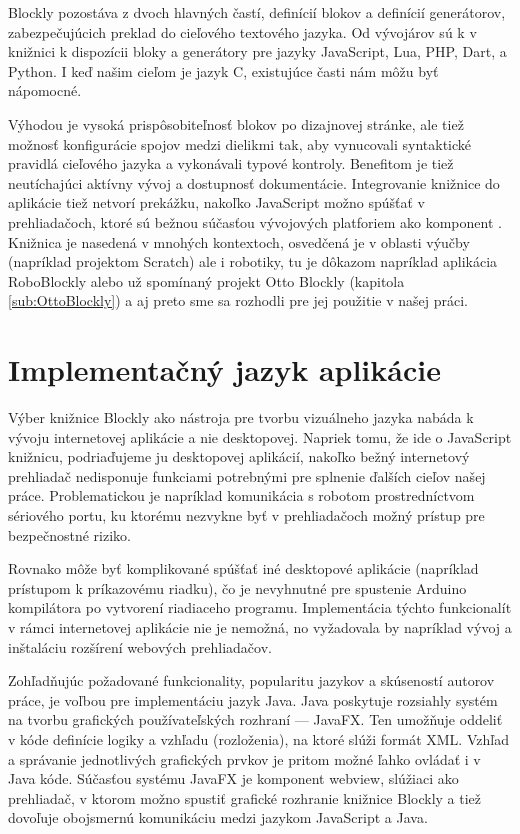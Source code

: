 Blockly pozostáva z dvoch hlavných častí, definícií blokov a definícií generátorov, zabezpečujúcich preklad do cieľového textového jazyka. Od vývojárov sú k v knižnici k dispozícii  bloky a generátory pre jazyky JavaScript, Lua, PHP, Dart, a Python. I keď našim cieľom je jazyk C, existujúce časti nám môžu byť nápomocné.

Výhodou je vysoká prispôsobiteľnosť blokov po dizajnovej stránke, ale tiež možnosť konfigurácie spojov medzi dielikmi tak, aby vynucovali syntaktické pravidlá cieľového jazyka a vykonávali typové kontroly. Benefitom je tiež neutíchajúci aktívny vývoj a dostupnosť dokumentácie. Integrovanie knižnice do aplikácie tiež netvorí prekážku, nakoľko JavaScript možno spúšťať v prehliadačoch, ktoré sú bežnou súčasťou vývojových platforiem ako komponent . Knižnica je nasedená v mnohých kontextoch, osvedčená je v oblasti výučby (napríklad projektom Scratch) ale i robotiky, tu je dôkazom napríklad aplikácia RoboBlockly alebo už spomínaný projekt Otto Blockly (kapitola \ref{sub:OttoBlockly}) a aj preto sme sa rozhodli pre jej použitie v našej práci.


\section{Implementačný jazyk aplikácie}
Výber knižnice Blockly ako nástroja pre tvorbu vizuálneho jazyka nabáda k vývoju internetovej aplikácie a nie desktopovej. Napriek tomu, že ide o JavaScript knižnicu, podriaďujeme ju desktopovej aplikácií, nakoľko bežný internetový prehliadač nedisponuje funkciami potrebnými pre splnenie ďalších cieľov našej práce. Problematickou je napríklad komunikácia s robotom prostredníctvom sériového portu, ku ktorému nezvykne byť v prehliadačoch možný prístup pre bezpečnostné riziko. 

Rovnako môže byť komplikované spúšťať iné desktopové aplikácie (napríklad prístupom k príkazovému riadku), čo je nevyhnutné pre spustenie Arduino kompilátora po vytvorení riadiaceho programu. Implementácia týchto funkcionalít v rámci internetovej aplikácie nie je nemožná, no vyžadovala by napríklad vývoj a inštaláciu rozšírení webových prehliadačov.

Zohľadňujúc požadované funkcionality, popularitu jazykov a skúseností autorov práce, je voľbou pre implementáciu jazyk Java. Java poskytuje rozsiahly systém na tvorbu grafických používateľských rozhraní --- JavaFX. Ten umožňuje oddeliť v kóde definície logiky a vzhľadu (rozloženia), na ktoré slúži formát XML. Vzhľad a správanie jednotlivých grafických prvkov je pritom možné ľahko ovládať i v Java kóde. Súčasťou systému JavaFX je komponent webview, slúžiaci ako prehliadač, v ktorom možno spustiť grafické rozhranie knižnice Blockly a tiež dovoľuje obojsmernú komunikáciu medzi jazykom JavaScript a Java.

